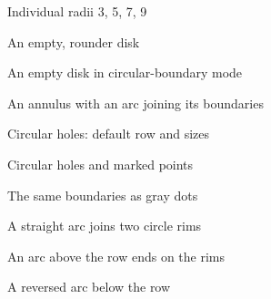 \documentclass{article}
\begin{document}
\clearpage
\begin{center}
\Large Individual radii 3, 5, 7, 9\par\bigskip
{}
\end{center}
\clearpage
\begin{center}
\Large An empty, rounder disk\par\bigskip
{}
\end{center}
\clearpage
\begin{center}
\Large An empty disk in circular-boundary mode\par\bigskip
{}
\end{center}
\clearpage
\begin{center}
\Large An annulus with an arc joining its boundaries\par\bigskip
{}
\end{center}
\clearpage
\begin{center}
\Large Circular holes: default row and sizes\par\bigskip
{}
\end{center}
\clearpage
\begin{center}
\Large Circular holes and marked points\par\bigskip
{}
\end{center}
\clearpage
\begin{center}
\Large The same boundaries as gray dots\par\bigskip
{}
\end{center}
\clearpage
\begin{center}
\Large A straight arc joins two circle rims\par\bigskip
{}
\end{center}
\clearpage
\begin{center}
\Large An arc above the row ends on the rims\par\bigskip
{}
\end{center}
\clearpage
\begin{center}
\Large A reversed arc below the row\par\bigskip
{}
\end{center}
\end{document}
